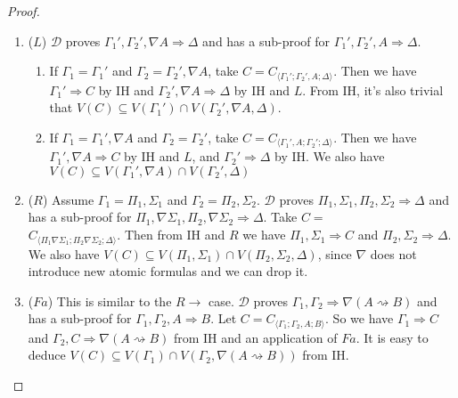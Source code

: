 \documentclass[12pt,a4paper]{article}
\theoremstyle{plain}
\theoremstyle{definition}
\begin{document}
\begin{proof}
\begin{enumerate}
	\item ($L$) $\mathcal{D}$ proves $\Gamma_1' , \Gamma_2' , \nabla A \Rightarrow \Delta$ and has a sub-proof for $\Gamma_1' , \Gamma_2' , A \Rightarrow \Delta$.
	\begin{enumerate}
		\item If $\Gamma_1 = \Gamma_1'$ and $\Gamma_2 = \Gamma_2' , \nabla A$, take $C = C_{\langle\Gamma_1';\Gamma_2',A;\Delta\rangle}$. Then we have $\Gamma_1' \Rightarrow C$ by IH and $\Gamma_2' , \nabla A \Rightarrow \Delta$ by IH and $L$. From IH, it's also trivial that $V(C) \subseteq V(\Gamma_1') \cap V(\Gamma_2',\nabla A,\Delta)$.
		
		\item If $\Gamma_1 = \Gamma_1' , \nabla A$ and $\Gamma_2 = \Gamma_2'$, take $C = C_{\langle\Gamma_1',A;\Gamma_2';\Delta\rangle}$. Then we have $\Gamma_1' , \nabla A \Rightarrow C$ by IH and $L$, and $\Gamma_2' \Rightarrow \Delta$ by IH. We also have $V(C) \subseteq V(\Gamma_1', \nabla A) \cap V(\Gamma_2',\Delta)$
	\end{enumerate}

	\item ($R$) Assume $\Gamma_1 = \Pi_1, \Sigma_1$ and $\Gamma_2 = \Pi_2, \Sigma_2$. $\mathcal{D}$ proves $\Pi_1, \Sigma_1, \Pi_2, \Sigma_2 \Rightarrow \Delta$ and has a sub-proof for $\Pi_1, \nabla\Sigma_1, \Pi_2, \nabla\Sigma_2 \Rightarrow \Delta$.
	Take $C =$\\ $C_{\langle\Pi_1\nabla\Sigma_1;\Pi_2\nabla\Sigma_2;\Delta\rangle}$. Then from IH and $R$ we have $\Pi_1, \Sigma_1 \Rightarrow C$ and $\Pi_2, \Sigma_2 \Rightarrow \Delta$. We also have $V(C) \subseteq V(\Pi_1,\Sigma_1) \cap V(\Pi_2,\Sigma_2,\Delta)$, since $\nabla$ does not introduce new atomic formulas and we can drop it.

	\item ($Fa$) This is similar to the $R\rightarrow$ case. $\mathcal{D}$ proves $\Gamma_1 , \Gamma_2 \Rightarrow \nabla(A \rightsquigarrow B)$ and has a sub-proof for $\Gamma_1 , \Gamma_2 , A \Rightarrow B$. Let $C = C_{\langle\Gamma_1;\Gamma_2,A;B\rangle}$. So we have $\Gamma_1 \Rightarrow C$ and $\Gamma_2 , C \Rightarrow \nabla (A \rightsquigarrow B)$ from IH and an application of $Fa$.
	It is easy to deduce $V(C) \subseteq V(\Gamma_1) \cap V(\Gamma_2 , \nabla (A \rightsquigarrow B))$ from IH.
\end{enumerate}
\end{proof}
\end{document}
